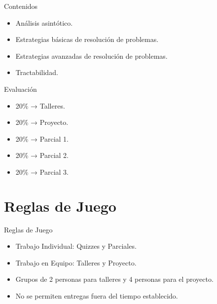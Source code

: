 \documentclass{beamer}
\begin{document}
\begin{frame}{Contenidos}
    \begin{itemize}
        \item Análisis asintótico.
        \item Estrategias básicas de resolución de problemas.
        \item Estrategias avanzadas de resolución de problemas.
        \item Tractabilidad.
    \end{itemize}
\end{frame}

\begin{frame}{Evaluación}
    \begin{itemize}
        \item 20\% → Talleres.
        \item 20\% → Proyecto.
        \item 20\% → Parcial 1.
        \item 20\% → Parcial 2.
        \item 20\% → Parcial 3.
    \end{itemize}
\end{frame}

\section{Reglas de Juego}

\begin{frame}{Reglas de Juego}
\begin{itemize}
    \item Trabajo Individual: Quizzes y Parciales.
    \item Trabajo en Equipo: Talleres y Proyecto.
    \item Grupos de 2 personas para talleres y 4 personas para el proyecto.
    \item No se permiten entregas fuera del tiempo establecido.
\end{itemize}
\end{frame}
\end{document}
